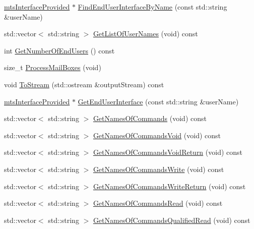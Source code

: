 \begin{DoxyCompactItemize}
\hyperlink{classmts_interface_provided}{mts\+Interface\+Provided} $\ast$ \hyperlink{classmts_interface_provided_abdddea75fe9d92f053c74fd0ce0acdd4}{Find\+End\+User\+Interface\+By\+Name} (const std\+::string \&user\+Name)
\item 
std\+::vector$<$ std\+::string $>$ \hyperlink{classmts_interface_provided_a277162b8ba56c13c974e9b59b5d6ca58}{Get\+List\+Of\+User\+Names} (void) const 
\item 
int \hyperlink{classmts_interface_provided_ac3c1b57073e0c3a0981f61f0f4391599}{Get\+Number\+Of\+End\+Users} () const 
\item 
size\+\_\+t \hyperlink{classmts_interface_provided_a0b0b7739f1b469b141e20eb46d1f3344}{Process\+Mail\+Boxes} (void)
\item 
void \hyperlink{classmts_interface_provided_a6887772d5f2b4846473f534b81a3eb5e}{To\+Stream} (std\+::ostream \&output\+Stream) const 
\item 
\hyperlink{classmts_interface_provided}{mts\+Interface\+Provided} $\ast$ \hyperlink{classmts_interface_provided_ac1300453ce7e30f5d6d98e4a588d3eb5}{Get\+End\+User\+Interface} (const std\+::string \&user\+Name)
\end{DoxyCompactItemize}
{\bf }\par
\begin{DoxyCompactItemize}
\item 
std\+::vector$<$ std\+::string $>$ \hyperlink{classmts_interface_provided_a51c476d0f40473d84ace9b164083b288}{Get\+Names\+Of\+Commands} (void) const 
\item 
std\+::vector$<$ std\+::string $>$ \hyperlink{classmts_interface_provided_a8a82481c9df782ff6dd21cdc55be4659}{Get\+Names\+Of\+Commands\+Void} (void) const 
\item 
std\+::vector$<$ std\+::string $>$ \hyperlink{classmts_interface_provided_a74fd81b8b2a63ae837c240883bcb6b1a}{Get\+Names\+Of\+Commands\+Void\+Return} (void) const 
\item 
std\+::vector$<$ std\+::string $>$ \hyperlink{classmts_interface_provided_ab439de7675785bf43a3286cb4f9a5521}{Get\+Names\+Of\+Commands\+Write} (void) const 
\item 
std\+::vector$<$ std\+::string $>$ \hyperlink{classmts_interface_provided_a3bb0d6c7eec56c275ad2958f68d6af1a}{Get\+Names\+Of\+Commands\+Write\+Return} (void) const 
\item 
std\+::vector$<$ std\+::string $>$ \hyperlink{classmts_interface_provided_a58a05b294fc5a89120d89191e7eb9a6b}{Get\+Names\+Of\+Commands\+Read} (void) const 
\item 
std\+::vector$<$ std\+::string $>$ \hyperlink{classmts_interface_provided_afc65a53da89134270337069444e563f5}{Get\+Names\+Of\+Commands\+Qualified\+Read} (void) const 
\end{DoxyCompactItemize}


